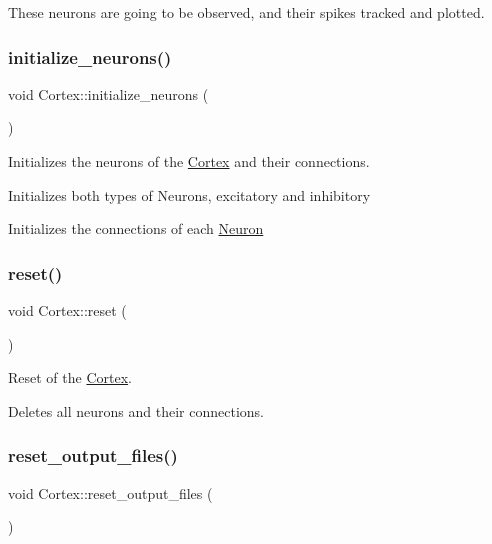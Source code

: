 These neurons are going to be observed, and their spikes tracked and plotted. \hypertarget{class_cortex_a4170f4ee3970170f0390bb484e4639d0}{}\label{class_cortex_a4170f4ee3970170f0390bb484e4639d0} 
\subsubsection{\texorpdfstring{initialize\+\_\+neurons()}{initialize\_neurons()}}
{\footnotesize\ttfamily void Cortex\+::initialize\+\_\+neurons (\begin{DoxyParamCaption}{ }\end{DoxyParamCaption})\hspace{0.3cm}{\ttfamily [static]}}



Initializes the neurons of the \hyperlink{class_cortex}{Cortex} and their connections. 

Initializes both types of Neurons, excitatory and inhibitory

Initializes the connections of each \hyperlink{class_neuron}{Neuron} \hypertarget{class_cortex_ac87b3cbab02738737df2f556e147a294}{}\label{class_cortex_ac87b3cbab02738737df2f556e147a294} 
\subsubsection{\texorpdfstring{reset()}{reset()}}
{\footnotesize\ttfamily void Cortex\+::reset (\begin{DoxyParamCaption}{ }\end{DoxyParamCaption})\hspace{0.3cm}{\ttfamily [static]}}



Reset of the \hyperlink{class_cortex}{Cortex}. 

Deletes all neurons and their connections. \hypertarget{class_cortex_ab6d894473b90db185847264480cc3b4d}{}\label{class_cortex_ab6d894473b90db185847264480cc3b4d} 
\subsubsection{\texorpdfstring{reset\+\_\+output\+\_\+files()}{reset\_output\_files()}}
{\footnotesize\ttfamily void Cortex\+::reset\+\_\+output\+\_\+files (\begin{DoxyParamCaption}{ }\end{DoxyParamCaption})\hspace{0.3cm}{\ttfamily [static]}}



